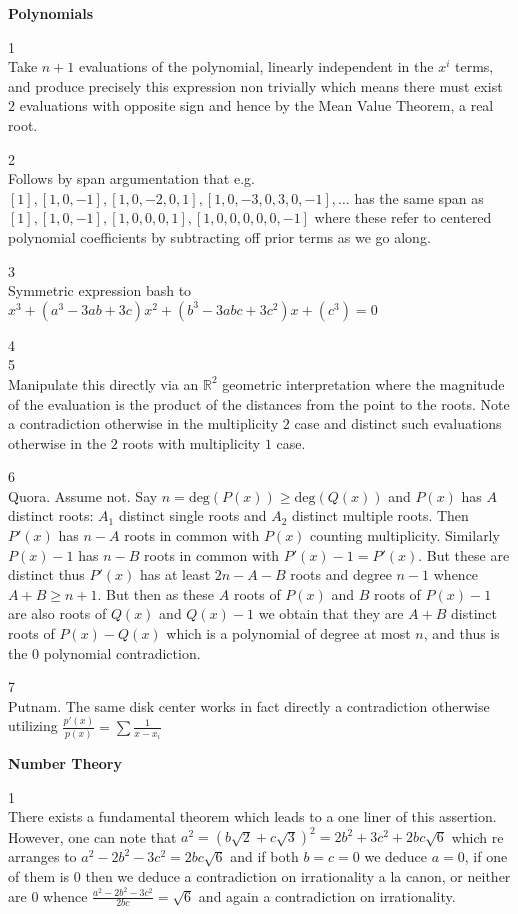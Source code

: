 \newpage

\textbf{Polynomials}

1 \\
Take $n+1$ evaluations of the polynomial, linearly independent in the $x^i$ terms, and produce precisely this expression non trivially which means there must exist $2$ evaluations with opposite sign and hence by the Mean Value Theorem, a real root.

2 \\
Follows by span argumentation that e.g. $[1],[1,0,-1],[1,0,-2,0,1],[1,0,-3,0,3,0,-1],\dots$ has the same span as $[1],[1,0,-1],[1,0,0,0,1],[1,0,0,0,0,0,-1]$ where these refer to centered polynomial coefficients by subtracting off prior terms as we go along.

3 \\
Symmetric expression bash to $\boxed{x^3+(a^3-3ab+3c)x^2+(b^3-3abc+3c^2)x+(c^3)=0}$

4 \\


5 \\
Manipulate this directly via an $\mathbb{R}^2$ geometric interpretation where the magnitude of the evaluation is the product of the distances from the point to the roots. Note a contradiction otherwise in the multiplicity $2$ case and distinct such evaluations otherwise in the $2$ roots with multiplicity $1$ case.

6 \\
Quora. Assume not. Say $n=\text{deg}(P(x)) \ge \text{deg}(Q(x))$ and $P(x)$ has $A$ distinct roots: $A_1$ distinct single roots and $A_2$ distinct multiple roots. Then $P'(x)$ has $n-A$ roots in common with $P(x)$ counting multiplicity. Similarly $P(x)-1$ has $n-B$ roots in common with $P'(x)-1=P'(x)$. But these are distinct thus $P'(x)$ has at least $2n-A-B$ roots and degree $n-1$ whence $A+B \ge n+1$. But then as these $A$ roots of $P(x)$ and $B$ roots of $P(x)-1$ are also roots of $Q(x)$ and $Q(x)-1$ we obtain that they are $A+B$ distinct roots of $P(x)-Q(x)$ which is a polynomial of degree at most $n$, and thus is the $0$ polynomial contradiction.

7 \\
Putnam. The same disk center works in fact directly a contradiction otherwise utilizing $\frac{p'(x)}{p(x)}=\sum \frac{1}{x-x_i}$

\newpage

\textbf{Number Theory}

1 \\
There exists a fundamental theorem which leads to a one liner of this assertion. However, one can note that $a^2=(b\sqrt{2}+c\sqrt{3})^2=2b^2+3c^2+2bc\sqrt{6}$ which re arranges to $a^2-2b^2-3c^2 = 2bc\sqrt{6}$ and if both $b=c=0$ we deduce $a=0$, if one of them is $0$ then we deduce a contradiction on irrationality a la canon, or neither are $0$ whence $\frac{a^2-2b^2-3c^2}{2bc} = \sqrt{6}$ and again a contradiction on irrationality.


